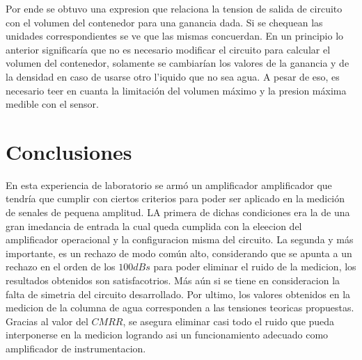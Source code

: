 \documentclass[a4paper]{article}
\begin{document}
Por ende se obtuvo una expresion que relaciona la tension de salida de circuito con el volumen del contenedor para una ganancia dada. Si se chequean las unidades correspondientes se ve que las mismas concuerdan. En un principio lo anterior significar\'ia que no es necesario modificar el circuito para calcular el volumen del contenedor, solamente se cambiar\'ian los valores de la ganancia y de la densidad en caso de usarse otro l'iquido que no sea agua. A pesar de eso, es necesario teer en cuanta la limitaci\'on del volumen m\'aximo y la presion m\'axima medible con el sensor.


\section{Conclusiones}

En esta experiencia de laboratorio se arm\'o un amplificador amplificador que tendr\'ia que cumplir con ciertos criterios para poder ser aplicado en la medici\'on de senales de pequena amplitud. LA primera de dichas condiciones era la de una gran imedancia de entrada la cual queda cumplida con la eleecion del amplificador operacional y la configuracion misma del circuito. La segunda y m\'as importante, es un rechazo de modo com\'un alto, considerando que se apunta a un rechazo en el orden de los $100dBs$ para poder eliminar el ruido de la medicion, los resultados obtenidos son satisfacotrios. M\'as a\'un si se tiene en consideracion la falta de simetria del circuito desarrollado. Por ultimo, los valores obtenidos en la medicion de la columna de agua corresponden a las tensiones teoricas propuestas. Gracias al valor del $CMRR$, se asegura eliminar casi todo el ruido que pueda interponerse en la medicion logrando asi un funcionamiento adecuado como amplificador de instrumentacion.
\end{document}
